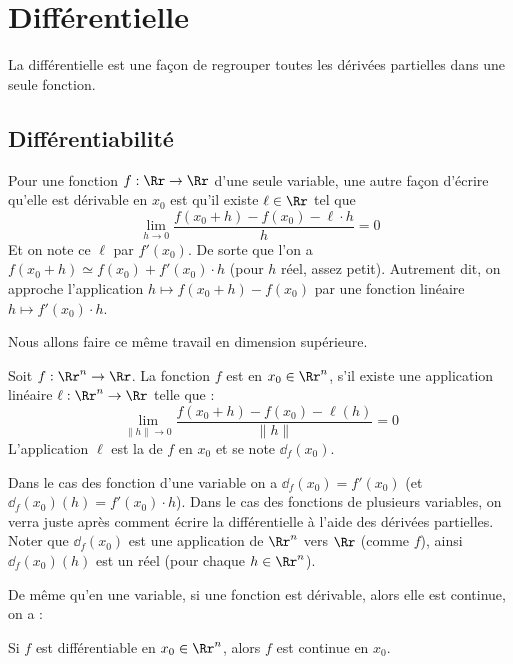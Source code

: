 \documentclass[12pt, class=report,crop=false]{standalone}
\begin{document}
{\begin{miniexercices}
\begin{enumerate}
\end{enumerate}
\end{miniexercices}





\section{Différentielle}


La différentielle est une façon de regrouper toutes les dérivées partielles dans une seule fonction.

\subsection{Différentiabilité}


Pour une fonction $f : \Rr \to \Rr$ d'une seule variable, une autre façon d'écrire qu'elle est dérivable en $x_0$ est qu'il existe $\ell \in \Rr$ tel que 
$$\lim_{h \rightarrow 0} \frac{f(x_0 + h) - f(x_0) - \ell \cdot h}{h} = 0$$
Et on note ce $\ell$ par $f'(x_0)$. De sorte que l'on a 
$f(x_0+h) \simeq f(x_0) + f'(x_0)\cdot h$ (pour $h$ réel, assez petit).
Autrement dit, on approche l'application $h \mapsto f(x_0+h) - f(x_0)$
par une fonction linéaire $h \mapsto f'(x_0) \cdot h$.

\bigskip

Nous allons faire ce même travail en dimension supérieure.
\begin{definition}
Soit $f : \Rr^n \to \Rr$. La fonction $f$ est  en $x_0 \in \Rr^n$, s'il existe une application linéaire $\ell : \Rr^n \to \Rr$ telle que :
$$\lim_{\|h\| \to 0}  \frac{f(x_0+ h) - f(x_0) - \ell(h)}{\|h\|} = 0$$
L'application $\ell $ est la  de $f$ en $x_0$ et se note $\dd_f(x_0)$.
\end{definition}


Dans le cas des fonction d'une variable on a $\dd_f(x_0) = f'(x_0)$ (et $\dd_f(x_0)(h) = f'(x_0)\cdot h$).
Dans le cas des fonctions de plusieurs variables, on verra juste après comment écrire la différentielle à l'aide des dérivées partielles.
Noter que $\dd_f(x_0)$ est une application de $\Rr^n$ vers $\Rr$ (comme $f$), ainsi $\dd_f(x_0)(h)$ est un réel (pour chaque $h\in\Rr^n$).


\bigskip

De même qu'en une variable, si une fonction est dérivable, alors elle est continue, on a :
\begin{proposition}
\label{prop:diffcont}
Si $f$ est différentiable en $x_0 \in \Rr^n$, alors $f$ est continue en $x_0$.
\end{proposition}

}
\end{document}
